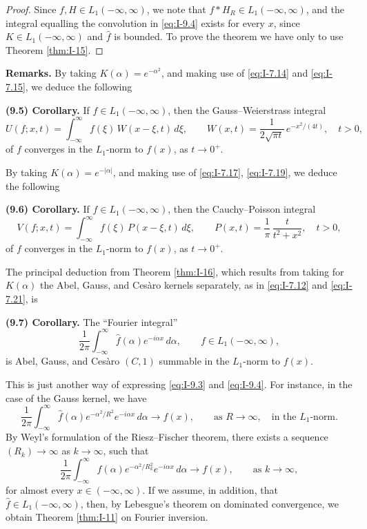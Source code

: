 \begin{proof}
Since $f,H\in L_1(-\infty,\infty)$, we note that $f*H_R\in L_1(-\infty,\infty)$, and the integral equalling the convolution in \eqref{eq:I-9.4} exists for every $x$, since $K\in L_1(-\infty,\infty)$ and $\widehat f$ is bounded. To prove the theorem we have only to use Theorem \ref{thm:I-15}.
\end{proof}

\noindent\textbf{Remarks.}
By taking $K(\alpha)=e^{-\alpha^{2}}$, and making use of \eqref{eq:I-7.14} and \eqref{eq:I-7.15}, we deduce the following

\noindent\textbf{(9.5) Corollary.}
If $f\in L_1(-\infty,\infty)$, then the Gauss--Weierstrass integral
\begin{equation}\tag{9.5}\label{eq:I-9.5}
U(f;x,t)=\int_{-\infty}^{\infty}f(\xi)\,W(x-\xi,t)\,d\xi,\qquad
W(x,t)=\frac{1}{2\sqrt{\pi t}}\,e^{-x^{2}/(4t)},\quad t>0,
\end{equation}
of $f$ converges in the $L_1$-norm to $f(x)$, as $t\to 0^+$.

By taking $K(\alpha)=e^{-|\alpha|}$, and making use of \eqref{eq:I-7.17}, \eqref{eq:I-7.19}, we deduce the following

\noindent\textbf{(9.6) Corollary.}
If $f\in L_1(-\infty,\infty)$, then the Cauchy--Poisson integral
\begin{equation}\tag{9.6}\label{eq:I-9.6}
V(f;x,t)=\int_{-\infty}^{\infty}f(\xi)\,P(x-\xi,t)\,d\xi,\qquad
P(x,t)=\frac{1}{\pi}\,\frac{t}{t^{2}+x^{2}},\quad t>0,
\end{equation}
of $f$ converges in the $L_1$-norm to $f(x)$, as $t\to 0^+$.

The principal deduction from Theorem \ref{thm:I-16}, which results from taking for $K(\alpha)$ the Abel, Gauss, and Ces\`aro kernels separately, as in \eqref{eq:I-7.12} and \eqref{eq:I-7.21}, is

\noindent\textbf{(9.7) Corollary.}
The ``Fourier integral''
\begin{equation*}
\frac{1}{2\pi}\int_{-\infty}^{\infty}\widehat f(\alpha)e^{-i\alpha x}\,d\alpha,\qquad f\in L_1(-\infty,\infty),
\end{equation*}
is Abel, Gauss, and Ces\`aro $(C,1)$ summable in the $L_1$-norm to $f(x)$.

This is just another way of expressing \eqref{eq:I-9.3} and \eqref{eq:I-9.4}. For instance, in the case of the Gauss kernel, we have
\begin{equation*}
\frac{1}{2\pi}\int_{-\infty}^{\infty}\widehat f(\alpha)e^{-\alpha^{2}/R^{2}}e^{-i\alpha x}\,d\alpha\to f(x),\qquad\text{as }R\to\infty,\quad\text{in the }L_1\text{-norm}.
\end{equation*}
By Weyl's formulation of the Riesz--Fischer theorem, there exists a sequence $(R_k)\to\infty$ as $k\to\infty$, such that
\begin{equation*}
\frac{1}{2\pi}\int_{-\infty}^{\infty}\widehat f(\alpha)e^{-\alpha^{2}/R_k^{2}}e^{-i\alpha x}\,d\alpha\to f(x),\qquad\text{as }k\to\infty,
\end{equation*}
for almost every $x\in(-\infty,\infty)$. If we assume, in addition, that $\widehat f\in L_1(-\infty,\infty)$, then, by Lebesgue's theorem on dominated convergence, we obtain Theorem \ref{thm:I-11} on Fourier inversion.

